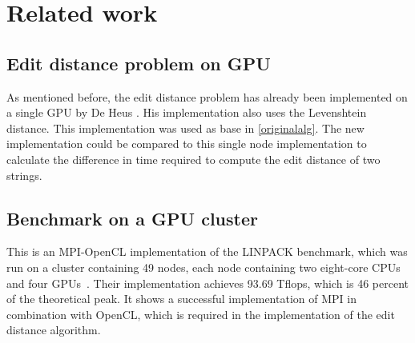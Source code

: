\section{Related work}

\subsection{Edit distance problem on GPU}
As mentioned before, the edit distance problem has already been implemented on a single GPU by De Heus \cite{Heus}.
His implementation also uses the Levenshtein distance.
This implementation was used as base in \cref{originalalg}.
The new implementation could be compared to this single node implementation to calculate the difference in time required to compute the edit distance of two strings.

\subsection{Benchmark on a GPU cluster}
This is an MPI-OpenCL implementation of the LINPACK benchmark, which was run on a cluster containing 49 nodes, each node containing two eight-core CPUs and four GPUs~\cite{Cluster}.
Their implementation achieves 93.69 Tflops, which is 46 percent of the theoretical peak.
It shows a successful implementation of MPI in combination with OpenCL, which is required in the implementation of the edit distance algorithm.
